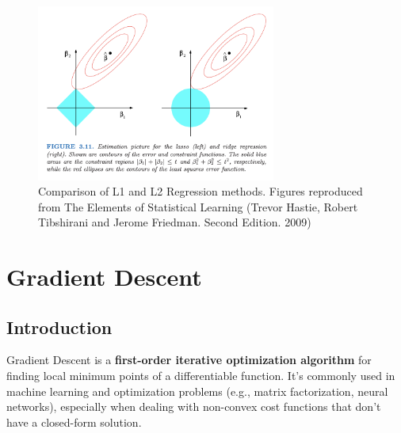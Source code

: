 \documentclass{report}
\begin{document}

\begin{figure}[h]
  \centering
  \includegraphics[width=0.7\textwidth]{images/09.png}
  \caption{Comparison of L1 and L2 Regression methods. Figures reproduced from The Elements of Statistical Learning  (Trevor Hastie, Robert Tibshirani and Jerome Friedman. Second Edition. 2009)}
\end{figure}


\chapter{Gradient Descent}

\section{Introduction}
Gradient Descent is a \textbf{first-order iterative optimization algorithm} for finding local minimum points of a differentiable function. It's commonly used in machine learning and optimization problems (e.g., matrix factorization, neural networks), especially when dealing with non-convex cost functions that don't have a closed-form solution.
\end{document}
